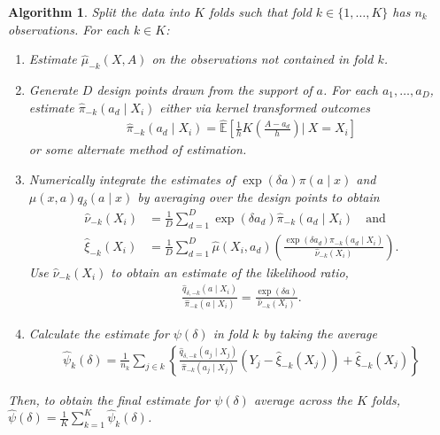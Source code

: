 \documentclass[11pt,twoside]{article}
\newtheorem{algorithm}{Algorithm}
\theoremstyle{definition}
\theoremstyle{remark}
\begin{document}
\begin{algorithm} \label{cross_validated_algo}
    Split the data into $K$ folds such that fold $k \in \{1, \ldots, K\}$ has $n_k$ observations. For each $k \in K$:
    \begin{enumerate}
        \item[(i)] Estimate $\widehat{\mu}_{-k}(X, A)$ on the observations not contained in fold $k$.
        \item[(ii)] Generate $D$ design points drawn from the support of $a$. For each $a_1, \ldots, a_D$, estimate $\widehat{\pi}_{-k}(a_d \mid X_i)$ either via kernel transformed outcomes 
        \begin{align*}
           \widehat{\pi}_{-k}(a_d \mid X_i) = \widehat{\mathbb{E}}\left[\frac{1}{h} K \left( \frac{A - a_d}{h} \right) \big| \ X = X_i\right]
        \end{align*}
        or some alternate method of estimation.
        \item[(iii)] Numerically integrate the estimates of $\exp(\delta a) \pi(a \mid x)$ and $\mu(x, a) q_\delta(a \mid x)$ by averaging over the design points to obtain
        \begin{align*}
            \widehat{\nu}_{-k}(X_i) &= \frac{1}{D} \sum^D_{d=1} \exp(\delta a_d) \widehat{\pi}_{-k}(a_d \mid X_i) \quad \text{and} \\
            \widehat{\xi}_{-k}(X_i) &=  \frac{1}{D} \sum^D_{d=1} \widehat{\mu}(X_i, a_d) \left(\frac{\exp(\delta a_d) \widehat{\pi}_{-k}(a_d \mid X_i)}{\widehat{\nu}_{-k}(X_i)}\right).
        \end{align*}
        Use $\widehat{\nu}_{-k}(X_i)$ to obtain an estimate of the likelihood ratio,
        \begin{align*}
            \frac{\widehat{q}_{\delta, - k}(a \mid X_i)}{\widehat{\pi}_{-k}(a \mid X_i) } = \frac{\exp(\delta a)}{\widehat{\nu}_{-k}(X_i)}.
        \end{align*}
        \item[(iv)] Calculate the estimate for $\psi(\delta)$ in fold $k$ by taking the average
        \begin{align*}
            \widehat{\psi}_k(\delta) = \frac{1}{n_k} \sum_{j \in k} \left\{ \frac{\widehat{q}_{\delta, - k}(a_j \mid X_j)}{\widehat{\pi}_{-k}(a_j \mid X_j) }\left(Y_j - \widehat{\xi}_{-k}(X_j) \right) + \widehat{\xi}_{-k}(X_j) \right\}
        \end{align*}
    \end{enumerate}
    Then, to obtain the final estimate for $\psi(\delta)$ average across the $K$ folds, $\widehat{\psi}(\delta) = \frac{1}{K} \sum^K_{k=1} \widehat{\psi}_k(\delta)$.
\end{algorithm}
\end{document}
